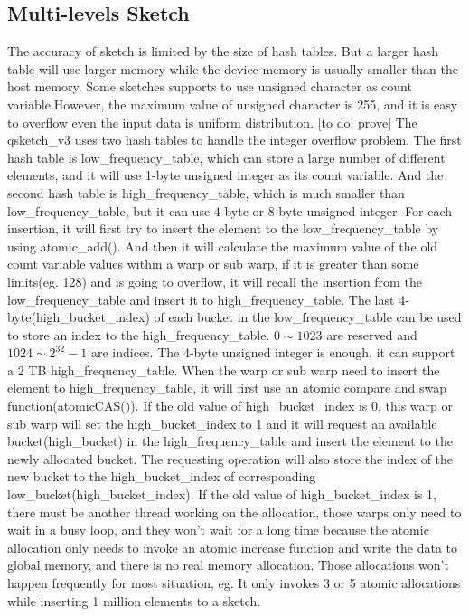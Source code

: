\documentclass[conference]{IEEEtran}
\begin{document}
\subsection{Multi-levels Sketch}
The accuracy of sketch is limited by the size of hash tables. But a larger hash table will use larger memory while the device memory is usually smaller than the host memory. Some sketches supports to use unsigned character as count variable.However, the maximum value of unsigned character is 255, and it is easy to overflow even the input data is uniform distribution.
[to do:  prove]
The qsketch\_v3 uses two hash tables to handle the integer overflow problem. The first hash table is low\_frequency\_table, which can store a large number of different elements, and it will use 1-byte unsigned integer as its count variable. And the second hash table is high\_frequency\_table, which is much smaller than low\_frequency\_table, but it can use 4-byte or 8-byte unsigned integer. For each insertion, it will first try to insert the element to the low\_frequency\_table by using atomic\_add(). And then it will calculate the maximum value of the old count variable values within a warp or sub warp, if it is greater than some limits(eg. 128) and is going to overflow, it will recall the insertion from the low\_frequency\_table and insert it to high\_frequency\_table. 
The last 4-byte(high\_bucket\_index) of each bucket in the low\_frequency\_table can be used to store an index to the high\_frequency\_table. $0 \sim 1023$ are reserved and $1024 \sim 2 ^ {32} - 1$ are indices. The 4-byte unsigned integer is enough, it can support a 2 TB high\_frequency\_table. When the warp or sub warp need to insert the element to high\_frequency\_table, it will first use an atomic compare and swap function(atomicCAS()). If the old value of high\_bucket\_index is 0, this warp or sub warp will set the high\_bucket\_index to 1 and it will request an available bucket(high\_bucket) in the high\_frequency\_table and insert the element to the newly allocated bucket. The requesting operation will also store the index of the new bucket to the high\_bucket\_index of corresponding low\_bucket(high\_bucket\_index). 
If the old value of high\_bucket\_index is 1, there must be another thread working on the allocation, those warps only need to wait in a busy loop, and they won't wait for a long time because the atomic allocation only needs to invoke an atomic increase function and write the data to global memory, and there is no real memory allocation. Those allocations won't happen frequently for most situation, eg. It only invokes 3 or 5 atomic allocations while inserting 1 million elements to a sketch.  %
\end{document}
